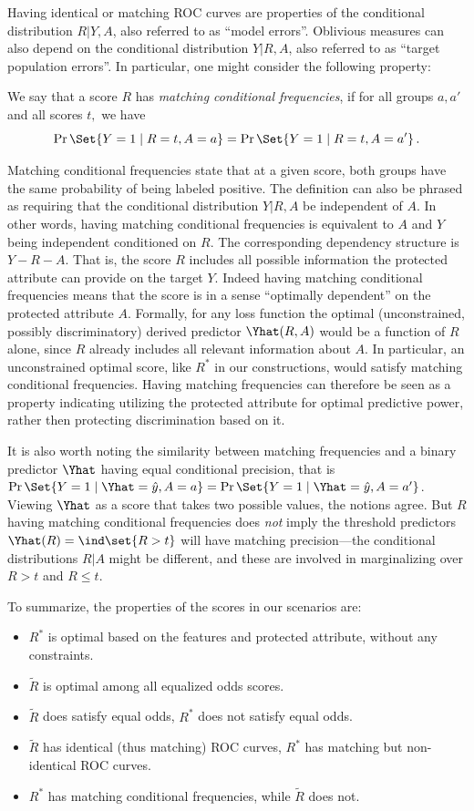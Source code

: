 Having identical or matching ROC curves are properties of the
conditional distribution $R|Y,A$, also referred to as ``model
errors''.  Oblivious measures can also depend on the conditional
distribution $Y|R,A$, also referred to as ``target population errors''.
In particular, one might consider the following property:
\begin{definition}
  We say that a score $R$ has \emph{matching conditional frequencies},
  if for all groups $a,a'$ and all scores $t,$ we have
\[
\Pr\Set{Y=1\mid R=t, A=a} = \Pr\Set{Y=1\mid R=t, A=a'}\,.
\]
\end{definition}
Matching conditional frequencies state that at a given score, both
groups have the same probability of being labeled positive.  The
definition can also be phrased as requiring that the conditional
distribution $Y|R,A$ be independent of $A$.  In other words, having
matching conditional frequencies is equivalent to $A$ and $Y$ being independent
conditioned on $R$.  The corresponding dependency structure is
$Y-R-A$.  That is, the score $R$ includes all possible information the
protected attribute can provide on the target $Y$.  Indeed having
matching conditional frequencies means that the score is in a sense
``optimally dependent'' on the protected attribute $A$.  Formally, for
any loss function the optimal (unconstrained, possibly discriminatory)
derived predictor $\Yhat(R,A)$ would be a function of $R$ alone, since
$R$ already includes all relevant information about $A$.  In
particular, an unconstrained optimal score, like $R^*$ in our
constructions, would satisfy matching conditional frequencies.  Having
matching frequencies can therefore be seen as a property indicating
utilizing the protected attribute for optimal predictive power,
rather then protecting discrimination based on it.

It is also worth noting the similarity between matching frequencies
and a binary predictor $\Yhat$ having equal conditional precision,
that is $\Pr\Set{Y=1\mid \Yhat=\hat{y}, A=a} = \Pr\Set{Y=1\mid
  \Yhat=\hat{y}, A=a'}$.  Viewing $\Yhat$ as a score that takes two
possible values, the notions agree. But $R$ having matching
conditional frequencies does {\em not} imply the threshold predictors
$\Yhat(R)=\ind\set{R>t}$ will have matching precision---the
conditional distributions $R|A$ might be different, and these are
involved in marginalizing over $R>t$ and $R\leq t$.

To summarize, the properties of the scores in our scenarios are:
\begin{itemize}
\item $R^*$ is optimal based on the features and protected attribute,
  without any constraints.
\item $\tilde{R}$ is optimal among all equalized odds scores.
\item $\tilde R$ does satisfy equal odds, $R^*$ does not satisfy equal odds.
\item $\tilde R$ has identical (thus matching) ROC curves, 
  $R^*$ has matching but non-identical ROC curves.
\item $R^*$ has matching conditional frequencies, while $\tilde{R}$
  does not.
\end{itemize}

